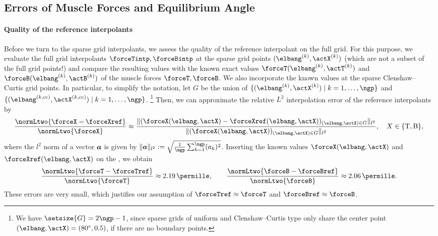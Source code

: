 \subsection{Errors of Muscle Forces and Equilibrium Angle}
\label{sec:732errors}

\paragraph{Quality of the reference interpolants}

Before we turn to the sparse grid interpolants,
we assess the quality of the reference interpolant on the full grid.
For this purpose, we evaluate the full grid interpolants
$\forceTintp, \forceBintp$
at the sparse grid points $(\elbang^{(k)}, \actX^{(k)})$
(which are not a subset of the full grid points!)
and compare the resulting values with the known exact values
$\forceT(\elbang^{(k)}, \actT^{(k)})$ and
$\forceB(\elbang^{(k)}, \actB^{(k)})$
of the muscle forces $\forceT, \forceB$.
We also incorporate the known values at the sparse
Clenshaw--Curtis grid points.
In particular, to simplify the notation,
let $G$ be the union of
$\{(\elbang^{(k)}, \actX^{(k)}) \mid k = 1, \dotsc, \ngp\}$ and
$\{(\elbang^{(k,\cc)}, \actX^{(k,\cc)}) \mid k = 1, \dotsc, \ngp\}$.%
\footnote{%
  We have $\setsize{G} = 2\ngp - 1$, since sparse grids of
  uniform and Clenshaw--Curtis type only
  share the center point $(\elbang, \actX) = (\ang{80}, 0.5)$,
  if there are no boundary points.%
}
Then, we can approximate the relative $L^2$ interpolation error
of the reference interpolants by
\begin{equation}
  \frac{\normLtwo{\forceX - \forceXref}}{\normLtwo{\forceX}}
  \approx
  \frac{
    \norm[l^2]{
      (\forceX(\elbang, \actX) - \forceXref(\elbang, \actX))_
      {(\elbang, \actX) \in G}
    }
  }{
    \norm[l^2]{(\forceX(\elbang, \actX))_{(\elbang, \actX) \in G}}
  },\quad
  X \in \{\mathrm{T}, \mathrm{B}\},
\end{equation}
where the $l^2$ norm of a vector ${\boldsymbol{a}}$ is given by
$\norm[l^2]{\*a} := \sqrt{\tfrac{1}{\ngp} \sum_{k=1}^{\ngp} (a_k)^2}$.
Inserting the known values $\forceX(\elbang, \actX)$ and
$\forceXref(\elbang, \actX)$ on the \rhs, we obtain
\begin{equation}
  \frac{\normLtwo{\forceT - \forceTref}}{\normLtwo{\forceT}}
  \approx \SI{2.19}{\permille},\qquad
  \frac{\normLtwo{\forceB - \forceBref}}{\normLtwo{\forceB}}
  \approx \SI{2.06}{\permille}.
\end{equation}
These errors are very small, which justifies our assumption of
$\forceTref \approx \forceT$ and $\forceBref \approx \forceB$.

